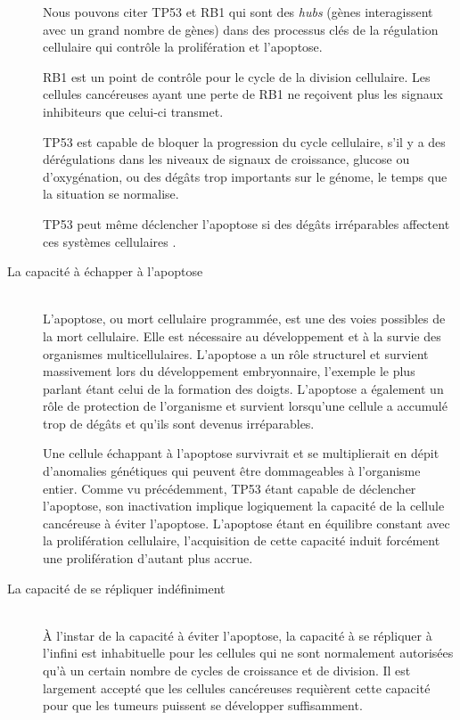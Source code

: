 \begin{description}
          Nous pouvons citer \acs{TP53} et \acs{RB1} qui sont des \emph{hubs} (gènes interagissent avec un grand nombre de gènes) dans des processus clés de la régulation cellulaire qui contrôle la prolifération et l'apoptose.

          \acs{RB1} est un point de contrôle pour le cycle de la division cellulaire.
          Les cellules cancéreuses ayant une perte de \acs{RB1} ne reçoivent plus les signaux inhibiteurs que celui-ci transmet.

          \acs{TP53} est capable de bloquer la progression du cycle cellulaire, s'il y a des dérégulations dans les niveaux de signaux de croissance, glucose ou d'oxygénation, ou des dégâts trop importants sur le génome, le temps que la situation se normalise.

          \acs{TP53} peut même déclencher l'apoptose si des dégâts irréparables affectent ces systèmes cellulaires \citep{Stephens2012,Peifer2012,Lazar2012,Zhang2012c,RozenblattRosen2012}.

        \item [La capacité à échapper à l'apoptose]                         \hfill \\
          L'apoptose, ou mort cellulaire programmée, est une des voies possibles de la mort cellulaire.
          Elle est nécessaire au développement et à la survie des organismes multicellulaires.
          L'apoptose a un rôle structurel et survient massivement lors du développement embryonnaire, l'exemple le plus parlant étant celui de la formation des doigts.
          L'apoptose a également un rôle de protection de l'organisme et survient lorsqu'une cellule a accumulé trop de dégâts et qu'ils sont devenus irréparables.

          Une cellule échappant à l'apoptose survivrait et se multiplierait en dépit d'anomalies génétiques qui peuvent être dommageables à l'organisme entier.
          Comme vu précédemment, \acs{TP53} étant capable de déclencher l'apoptose, son inactivation implique logiquement la capacité de la cellule cancéreuse à éviter l'apoptose.
          L'apoptose étant en équilibre constant avec la prolifération cellulaire, l'acquisition de cette capacité induit forcément une prolifération d'autant plus accrue.

        \item [La capacité de se répliquer indéfiniment]                \hfill \\
          À l'instar de la capacité à éviter l'apoptose, la capacité à se répliquer à l'infini est inhabituelle pour les cellules qui ne sont normalement autorisées qu'à un certain nombre de cycles de croissance et de division.
          Il est largement accepté que les cellules cancéreuses requièrent cette capacité pour que les tumeurs puissent se développer suffisamment.


\end{description}
